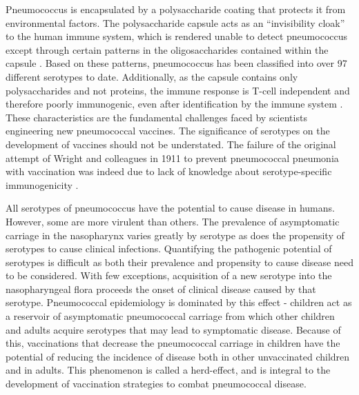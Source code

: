 \documentclass[]{book}
\theoremstyle{definition}
\theoremstyle{definition}
\theoremstyle{definition}
\theoremstyle{remark}
\begin{document}
Pneumococcus is encapsulated by a polysaccharide coating that protects
it from environmental factors. The polysaccharide capsule acts as an
``invisibility cloak'' to the human immune system, which is rendered
unable to detect pneumococcus except through certain patterns in the
oligosaccharides contained within the capsule \citep{Epstein1995}. Based
on these patterns, pneumococcus has been classified into over 97
different serotypes to date. Additionally, as the capsule contains only
polysaccharides and not proteins, the immune response is T-cell
independent and therefore poorly immunogenic, even after identification
by the immune system \citep{Geno2015b}. These characteristics are the
fundamental challenges faced by scientists engineering new pneumococcal
vaccines. The significance of serotypes on the development of vaccines
should not be understated. The failure of the original attempt of Wright
and colleagues in 1911 to prevent pneumococcal pneumonia with
vaccination was indeed due to lack of knowledge about serotype-specific
immunogenicity \citep{Wright1914}.

All serotypes of pneumococcus have the potential to cause disease in
humans. However, some are more virulent than others. The prevalence of
asymptomatic carriage in the nasopharynx varies greatly by serotype as
does the propensity of serotypes to cause clinical infections.
Quantifying the pathogenic potential of serotypes is difficult as both
their prevalence and propensity to cause disease need to be considered.
With few exceptions, acquisition of a new serotype into the
nasopharyngeal flora proceeds the onset of clinical disease caused by
that serotype. Pneumococcal epidemiology is dominated by this effect -
children act as a reservoir of asymptomatic pneumococcal carriage from
which other children and adults acquire serotypes that may lead to
symptomatic disease. Because of this, vaccinations that decrease the
pneumococcal carriage in children have the potential of reducing the
incidence of disease both in other unvaccinated children and in adults.
This phenomenon is called a herd-effect, and is integral to the
development of vaccination strategies to combat pneumococcal disease.
\end{document}
